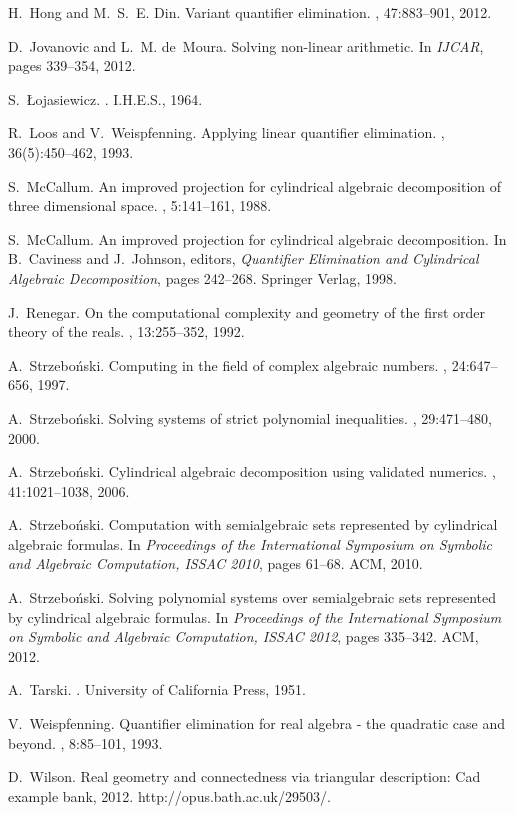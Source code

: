 \documentclass[english]{amsart}
\numberwithin{equation}{section}
\numberwithin{figure}{section}
\begin{document}
\begin{thebibliography}{10}
H.~Hong and M.~S.~E. Din.
\newblock Variant quantifier elimination.
, 47:883--901, 2012.

D.~Jovanovic and L.~M. de~Moura.
\newblock Solving non-linear arithmetic.
\newblock In {\em IJCAR}, pages 339--354, 2012.

S.~\L{}ojasiewicz.
.
\newblock I.H.E.S., 1964.

R.~Loos and V.~Weispfenning.
\newblock Applying linear quantifier elimination.
, 36(5):450--462, 1993.

S.~McCallum.
\newblock An improved projection for cylindrical algebraic decomposition of
  three dimensional space.
, 5:141--161, 1988.

S.~McCallum.
\newblock An improved projection for cylindrical algebraic decomposition.
\newblock In B.~Caviness and J.~Johnson, editors, {\em Quantifier Elimination
  and Cylindrical Algebraic Decomposition}, pages 242--268. Springer Verlag,
  1998.

J.~Renegar.
\newblock On the computational complexity and geometry of the first order
  theory of the reals.
, 13:255--352, 1992.

A.~Strzebo\'nski.
\newblock Computing in the field of complex algebraic numbers.
, 24:647--656, 1997.

A.~Strzebo\'nski.
\newblock Solving systems of strict polynomial inequalities.
, 29:471--480, 2000.

A.~Strzebo\'nski.
\newblock Cylindrical algebraic decomposition using validated numerics.
, 41:1021--1038, 2006.

A.~Strzebo\'nski.
\newblock Computation with semialgebraic sets represented by cylindrical
  algebraic formulas.
\newblock In {\em Proceedings of the International Symposium on Symbolic and
  Algebraic Computation, ISSAC 2010}, pages 61--68. ACM, 2010.

A.~Strzebo\'nski.
\newblock Solving polynomial systems over semialgebraic sets represented by
  cylindrical algebraic formulas.
\newblock In {\em Proceedings of the International Symposium on Symbolic and
  Algebraic Computation, ISSAC 2012}, pages 335--342. ACM, 2012.

A.~Tarski.
.
\newblock University of California Press, 1951.

V.~Weispfenning.
\newblock Quantifier elimination for real algebra - the quadratic case and
  beyond.
, 8:85--101, 1993.

D.~Wilson.
\newblock Real geometry and connectedness via triangular description: Cad
  example bank, 2012.
\newblock http://opus.bath.ac.uk/29503/.

\end{thebibliography}
\end{document}
